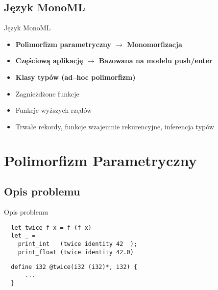 \documentclass{beamer}
\begin{document}
\subsection{Język MonoML}

\begin{frame}{Język MonoML}
\begin{itemize}
    \pause
    \item \textbf{Polimorfizm parametryczny $\rightarrow$ Monomorfizacja}
    \pause
    \item \textbf{Częściową aplikację $\rightarrow$ Bazowana na modelu
    push/enter}
    \pause
    \item \textbf{Klasy typów (ad--hoc polimorfizm)}
    \pause 
    \item Zagnieżdżone funkcje 
    \item Funkcje wyższych rzędów 
    \item Trwałe rekordy, funkcje wzajemnie rekurencyjne, inferencja typów
\end{itemize}
\end{frame}

\section{Polimorfizm Parametryczny}

\subsection{Opis problemu}

\begin{frame}[fragile]{Opis problemu}%
\begin{center}
\begin{minipage}{0.8\textwidth}
\begin{verbatim}
  let twice f x = f (f x)
  let _ = 
    print_int   (twice identity 42  );
    print_float (twice identity 42.0)
\end{verbatim}
\pause
\pagebreak
\pagebreak
\begin{verbatim}
  define i32 @twice(i32 (i32)*, i32) {
      ...
  }
\end{verbatim}
\end{minipage}
\end{center}
\end{frame}
\end{document}

